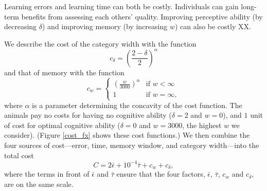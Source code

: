 Learning errors and learning time can both be costly. Individuals can gain long-term benefits from assessing each others' quality. 
Improving  perceptive ability (by decreasing $\delta$) and improving memory (by increasing $w$) can also be costly XX. %

We describe the cost of the category width with the function
\begin{equation*}
c_\delta = \left(\frac{2-\delta}{2}\right)^\alpha
\end{equation*}
and that of memory with the function
\begin{equation*}
c_w = \left\{\begin{array}{lll}\left(\frac{w}{3000}\right)^\alpha & \text{if } w<\infty
\\ 1 & \text{if } w=\infty, \end{array}\right.
\end{equation*}
where $\alpha$ is a parameter determining the concavity of the cost function. The animals pay no costs for having no cognitive ability ($\delta=2$ and $w=0$), and $1$ unit of cost for optimal cognitive ability ($\delta=0$ and $w=3000$, the highest $w$ we consider). (Figure \ref{cost_fx} shows these cost functions.)
We then combine the four sources of cost---error, time, memory window, and category width---into the total cost 
\begin{equation*}
C = 2\bar{\epsilon}+10^{-4}\bar{\tau}+c_w+c_\delta,
\end{equation*}
where the terms in front of $\bar{\epsilon}$ and $\bar{\tau}$ ensure that the four factors, $\bar{\epsilon}$, $\bar{\tau}$, $c_w$ and $c_\delta$, are on the same scale. 

